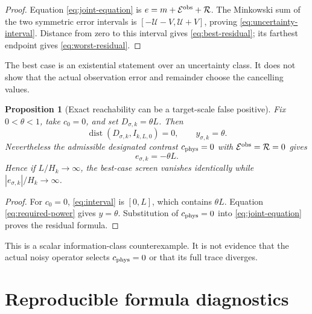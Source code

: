 \documentclass[11pt]{article}
\newtheorem{proposition}[theorem]{Proposition}
\theoremstyle{remark}
\newcommand{\dist}{\operatorname{dist}}
\newcommand{\cE}{\mathcal E}
\newcommand{\cR}{\mathcal R}
\newcommand{\cU}{\mathcal U}
\begin{document}
\begin{proof}
Equation \eqref{eq:joint-equation} is $e=m+\cE^{\rm obs}+\cR$.  The Minkowski
sum of the two symmetric error intervals is
$[-\cU-V,\cU+V]$, proving \eqref{eq:uncertainty-interval}.  Distance from
zero to this interval gives \eqref{eq:best-residual}; its farthest endpoint
gives \eqref{eq:worst-residual}.
\end{proof}

The best case is an existential statement over an uncertainty class.  It
does not show that the actual observation error and remainder choose the
cancelling values.

\begin{proposition}[Exact reachability can be a target-scale false positive]
\label{prop:false-positive}
Fix $0<\theta<1$, take $c_0=0$, and set $D_{\sigma,k}=\theta L$.  Then
\begin{equation}
 \dist(D_{\sigma,k},I_{k,L,0})=0,
 \qquad
 y_{\sigma,k}=\theta.
 \label{eq:screen-passes}
\end{equation}
Nevertheless the admissible designated contrast $c_{\rm phys}=0$ with
$\cE^{\rm obs}=\cR=0$ gives
\begin{equation}
 e_{\sigma,k}=-\theta L.
 \label{eq:false-positive-residual}
\end{equation}
Hence if $L/H_k\to\infty$, the best-case screen vanishes identically while
$|e_{\sigma,k}|/H_k\to\infty$.
\end{proposition}

\begin{proof}
For $c_0=0$, \eqref{eq:interval} is $[0,L]$, which contains $\theta L$.
Equation \eqref{eq:required-power} gives $y=\theta$.  Substitution of
$c_{\rm phys}=0$ into \eqref{eq:joint-equation} proves the residual formula.
\end{proof}

This is a scalar information-class counterexample.  It is not evidence that
the actual noisy operator selects $c_{\rm phys}=0$ or that its full trace
diverges.

\section{Reproducible formula diagnostics}
\end{document}
